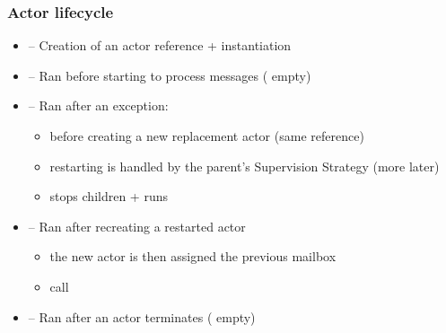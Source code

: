 \documentclass[aspectratio=169]{beamer}
\begin{document}
\begin{frame}\frametitle{Actor lifecycle}

\begin{itemize}
  \item {} -- Creation of an actor reference + instantiation
  \item {} -- Ran before starting to process messages ( empty)
  \item {} -- Ran after an \alert{exception}:
    \begin{itemize}
      \item before creating a new replacement actor (same reference)
      \item restarting is handled by the parent's \alert{Supervision Strategy} (more later)
      \item {} stops children + runs 
    \end{itemize}
  \item {} -- Ran after recreating a restarted actor
    \begin{itemize}
      \item the new actor is then assigned the previous mailbox
      \item {} call 
    \end{itemize}
  \item {} -- Ran after an actor terminates ( empty)
\end{itemize}
\end{frame}

\end{document}
